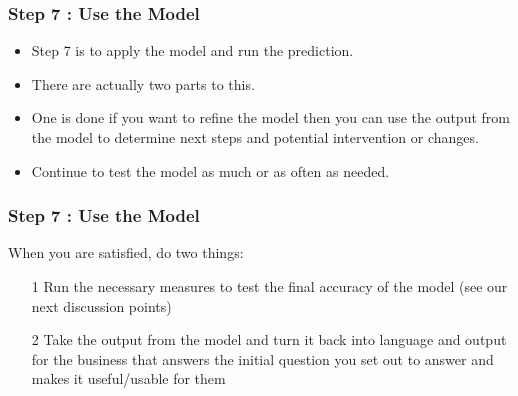 \documentclass[PredictiveAnalytics101.tex]{subfiles}
\begin{document}
\begin{frame}
\frametitle{Step 7 : Use the Model}
\Large
\begin{itemize}
\item Step 7 is to apply the model and run the prediction. 
\item There are actually two parts to this. 
\item One is done if
you want to refine the model then you can use the output from the model to determine next steps and
potential intervention or changes. 
\item Continue to test the model as much or as often as needed. 
\end{itemize}


\end{frame}
\begin{frame}
	\frametitle{Step 7 : Use the Model}
	\Large
When
you are satisfied, do two things:
\begin{itemize}
\item[1] Run the necessary measures to test the final accuracy of the model (see our next discussion
points)
\item[2] Take the output from the model and turn it back into language and output for the business
that answers the initial question you set out to answer and makes it useful/usable for them 
\end{itemize}
\end{frame}
\end{document}
